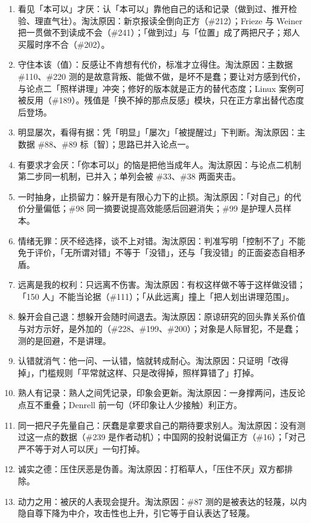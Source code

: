 \documentclass[prep,both]{debate}
\begin{document}
\begin{enumerate}[leftmargin=1.8em]
\item 看见「本可以」才厌：认「本可以」靠他自己的话和记录（做到过、推开检验、理直气壮）。淘汰原因：新京报读全倒向正方（\#212）；Frieze 与 Weiner 把一贯做不到读成不会（\#241）；「做到过」与「位置」成了两把尺子；郑人买履时序不合（\#202）。
\item 守住本该（值）：反感让不肯想有代价，标准才立得住。淘汰原因：主数据 \#110、\#220 测的是故意背叛、能做不做，是坏不是蠢；要让对方感到代价，与论点二「照样讲理」冲突；修好的版本就是正方的替代态度；Linux 案例可被反用（\#189）。残值是「换不掉的那点反感」模块，只在正方拿出替代态度后登场。
\item 明显屡次，看得有据：凭「明显」「屡次」「被提醒过」下判断。淘汰原因：主数据 \#88、\#89 标〔智〕；思路已并入论点一。
\item 有要求才会厌：「你本可以」的恼是把他当成年人。淘汰原因：与论点二机制第二步同一机制，已并入；单列会被 \#33、\#38 两面夹击。
\item 一时抽身，止损留力：躲开是有限心力下的止损。淘汰原因：「对自己」的代价分量偏低；\#98 同一摘要说提高效能感后回避消失；\#99 是护理人员样本。
\item 情绪无罪：厌不经选择，谈不上对错。淘汰原因：判准写明「控制不了」不能免于评价，「无所谓对错」不等于「没错」，还与「我没错」的正面姿态自相矛盾。
\item 远离是我的权利：只远离不伤害。淘汰原因：有权这样做不等于这样做没错；「150 人」不能当论据（\#111）；「从此远离」撞上「把人划出讲理范围」。
\item 躲开会自己退：想躲开会随时间退去。淘汰原因：原谅研究的回头靠关系价值与对方示好，是外加的（\#228、\#199、\#200）；对象是人际冒犯，不是蠢；测的是回避，不是讲理。
\item 认错就消气：他一问、一认错，恼就转成耐心。淘汰原因：只证明「改得掉」，门槛规则「平常就这样、只是改得掉，照样算错了」打掉。
\item 熟人有记录：熟人之间凭记录，印象会更新。淘汰原因：一身撑两问，违反论点互不重叠；Denrell 前一句（坏印象让人少接触）利正方。
\item 同一把尺子先量自己：厌蠢是拿要求自己的期待要求别人。淘汰原因：没有测过这一点的数据（\#239 是作者动机）；中国网的投射说偏正方（\#16）；「对己严不等于对人可以厌」一句打掉。
\item 诚实之德：压住厌恶是伪善。淘汰原因：打稻草人，「压住不厌」双方都排除。
\item 动力之用：被厌的人表现会提升。淘汰原因：\#87 测的是被表达的轻蔑，以内隐自尊下降为中介，攻击性也上升，引它等于自认表达了轻蔑。

\end{enumerate}
\end{document}
